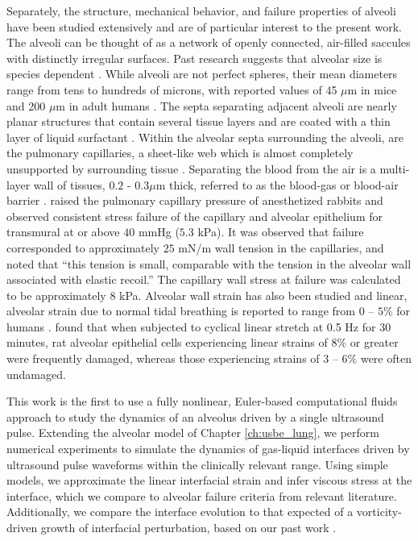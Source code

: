 Separately, the structure, mechanical behavior, and failure properties
of alveoli have been studied extensively and are of particular
interest to the present work. The alveoli can be thought of as a
network of openly connected, air-filled saccules with distinctly
irregular surfaces. Past research suggests that alveolar size is
species dependent \citep{Faffe2002}. While alveoli are not perfect
spheres, their mean diameters range from tens to hundreds of microns,
with reported values of 45 $\mu$m in mice and 200 $\mu$m in adult
humans \citep{Knust2008,Ochs2004}. The septa separating adjacent
alveoli are nearly planar structures that contain several tissue
layers and are coated with a thin layer of liquid surfactant
\citep{Gil1979,Reifenrath1975,Perlman2014}. Within the alveolar septa
surrounding the alveoli, are the pulmonary capillaries, a sheet-like
web which is almost completely unsupported by surrounding tissue
\citep{West1991}. Separating the blood from the air is a multi-layer
wall of tissues, $0.2$ - $0.3\mu$m thick, referred to as the blood-gas
or blood-air barrier \citep{West2000}. \cite{West1991} raised the
pulmonary capillary pressure of anesthetized rabbits and observed
consistent stress failure of the capillary and alveolar epithelium for
transmural at or above $40$ mmHg ($5.3$ kPa). It was observed that
failure corresponded to approximately $25$ mN/m wall tension in the
capillaries, and noted that ``this tension is small, comparable with
the tension in the alveolar wall associated with elastic recoil.''
The capillary wall stress at failure was calculated to be
approximately $8$ kPa. Alveolar wall strain has also been studied and
linear, alveolar strain due to normal tidal breathing is reported to
range from $0$ -- $5$\% for humans \citep{Roan2011}. \cite{Belete2010}
found that when subjected to cyclical linear stretch at 0.5 Hz for 30
minutes, rat alveolar epithelial cells experiencing linear strains of
$8\%$ or greater were frequently damaged, whereas those experiencing
strains of $3$ -- $6\%$ were often undamaged.

This work is the first to use a fully nonlinear, Euler-based
computational fluids approach to study the dynamics of an alveolus
driven by a single ultrasound pulse. Extending the alveolar model of
Chapter \ref{ch:usbe_lung}, we perform numerical experiments to
simulate the dynamics of gas-liquid interfaces driven by ultrasound
pulse waveforms within the clinically relevant range. Using simple
models, we approximate the linear interfacial strain and infer viscous
stress at the interface, which we compare to alveolar failure criteria
from relevant literature. Additionally, we compare the interface
evolution to that expected of a vorticity-driven growth of interfacial
perturbation, based on our past work \citep{Patterson2017,Patterson2017b}.

